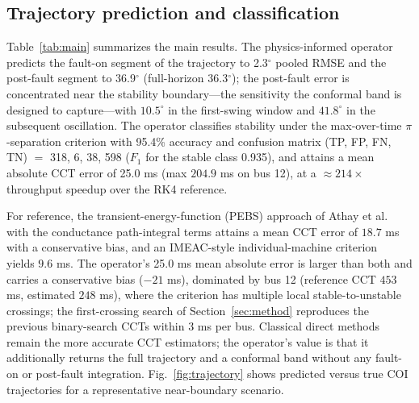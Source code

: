 \documentclass[5p,times]{elsarticle}
\newcommand{\rmseFault}{2.3}          %
\newcommand{\rmsePost}{36.9}          %
\newcommand{\rmseAll}{36.3}           %
\newcommand{\pctACC}{95.4\%}          %
\newcommand{\ccterr}{25.0}            %
\newcommand{\confmat}{318, 6, 38, 598} %
\newcommand{\fone}{0.935}             %
\newcommand{\timSU}{214}              %
\begin{document}
\subsection{Trajectory prediction and classification}
Table~\ref{tab:main} summarizes the main results. The physics-informed operator predicts the
fault-on segment of the trajectory to \rmseFault{}$^\circ$ pooled RMSE and the post-fault segment
to \rmsePost{}$^\circ$ (full-horizon \rmseAll{}$^\circ$); the post-fault error is concentrated
near the stability boundary---the sensitivity the conformal band is designed to capture---with
$10.5^\circ$ in the first-swing window and $41.8^\circ$ in the subsequent oscillation. The
operator classifies stability under the max-over-time $\pi$-separation criterion with \pctACC{}
accuracy and confusion matrix (TP, FP, FN, TN) $=$ \confmat{} ($F_1$ for the stable class
\fone{}), and attains a mean absolute CCT error of \ccterr{} ms (max $204.9$ ms on bus 12), at
a $\approx\timSU{}\times$ throughput speedup over the RK4 reference.

For reference, the transient-energy-function (PEBS) approach of Athay et
al.~\cite{athay1979transient} with the conductance path-integral terms attains a mean CCT error
of $18.7$ ms with a conservative bias, and an IMEAC-style individual-machine
criterion~\cite{wang2018individual} yields $9.6$ ms. The operator's \ccterr{} ms mean absolute
error is larger than both and carries a conservative bias
($-21$ ms), dominated by bus 12 (reference CCT $453$ ms, estimated $248$ ms), where the criterion
has multiple local stable-to-unstable crossings; the first-crossing search of
Section~\ref{sec:method} reproduces the previous binary-search CCTs within $3$ ms per bus.
Classical direct methods remain the more accurate CCT estimators; the operator's value is that it
additionally returns the full trajectory and a conformal band without any fault-on or post-fault
integration. Fig.~\ref{fig:trajectory} shows predicted versus true COI trajectories for a
representative near-boundary scenario.
\end{document}
